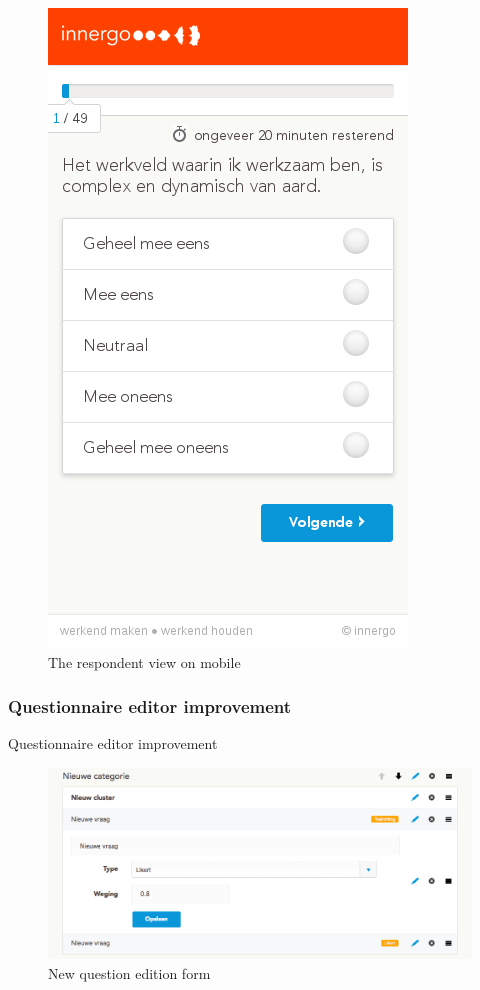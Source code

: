 \documentclass[10pt,a4paper]{beamer}
\begin{document}
\begin{frame}

\begin{figure}[htp]
\centering
\includegraphics[scale=0.32]{../img/calibris3.png}
 \caption{The respondent view on mobile}
 \label{fig.calibris3}
\end{figure}

\end{frame}

\subsubsection{Questionnaire editor improvement}

\begin{frame}{Questionnaire editor improvement}
	\begin{figure}[htp]
	\centering
	\includegraphics[scale=.32]{../img/editor.png}
	 \caption{New question edition form}
	 \label{fig.editor}
	\end{figure}
\end{frame}
\end{document}

